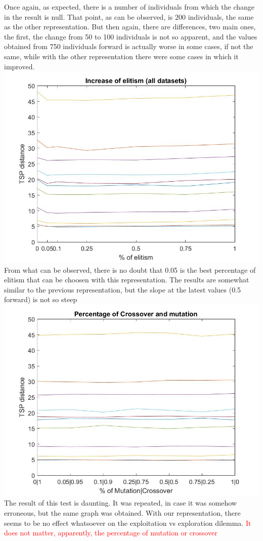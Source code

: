 Once again, as expected, there is a number of individuals from which the
change in the result is null. That point, as can be observed, is 200
individuals, the same as the other representation. But then again, there
are differences, two main ones, the first, the change from 50 to 100
individuals is not so apparent, and the values obtained from 750
individuals forward is actually worse in some cases, if not the same, while
with the other representation there were some cases in which it
improved. \\
\includegraphics[width=\textwidth]{img/order_crossover/elitism.jpg}\\
From what can be observed, there is no doubt that 0.05 is the best
percentage of elitism that can be choosen with this representation. The results
are somewhat similar to the previous representation, but the slope at the
latest values (0.5 forward) is not so steep\\
\includegraphics[width=\textwidth]{img/order_crossover/crossMut.jpg}\\
The result of this test is daunting. It was repeated, in case it was somehow
erroneous, but the same graph was obtained. With our representation, there
seems to be no effect whatsoever on the exploitation vs exploration dilemma.
\textcolor{red}{It does not matter, apparently, the percentage of mutation
or crossover}
\\


